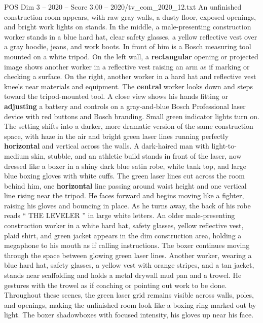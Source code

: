 \begin{textsample}{POS Dim 3 – 2020 – Score 3.00 – 2020/tv\_com\_2020\_12.txt}  \label{ex:f3_pos_080}
An unfinished construction room appears, with raw gray walls, a dusty floor, exposed openings, and bright work lights on stands.
In the middle, a male-presenting construction worker stands in a blue hard hat, clear safety glasses, a yellow reflective vest over a gray hoodie, jeans, and work boots.
In front of him is a Bosch measuring tool mounted on a white tripod.
On the left wall, a \textbf{rectangular} opening or projected image shows another worker in a reflective vest raising an arm as if marking or checking a surface.
On the right, another worker in a hard hat and reflective vest kneels near materials and equipment.
The \textbf{central} worker looks down and steps toward the tripod-mounted tool.
A close view shows his hands fitting or \textbf{adjusting} a battery and controls on a gray-and-blue Bosch Professional laser device with red buttons and Bosch branding.
Small green indicator lights turn on.
The setting shifts into a darker, more dramatic version of the same construction space, with haze in the air and bright green laser lines running perfectly \textbf{horizontal} and vertical across the walls.
A dark-haired man with light-to-medium skin, stubble, and an athletic build stands in front of the laser, now dressed like a boxer in a shiny dark blue satin robe, white tank top, and large blue boxing gloves with white cuffs.
The green laser lines cut across the room behind him, one \textbf{horizontal} line passing around waist height and one vertical line rising near the tripod.
He faces forward and begins moving like a fighter, raising his gloves and bouncing in place.
As he turns away, the back of his robe reads “ THE LEVELER ” in large white letters.
An older male-presenting construction worker in a white hard hat, safety glasses, yellow reflective vest, plaid shirt, and green jacket appears in the dim construction area, holding a megaphone to his mouth as if calling instructions.
The boxer continues moving through the space between glowing green laser lines.
Another worker, wearing a blue hard hat, safety glasses, a yellow vest with orange stripes, and a tan jacket, stands near scaffolding and holds a metal drywall mud pan and a trowel.
He gestures with the trowel as if coaching or pointing out work to be done.
Throughout these scenes, the green laser grid remains visible across walls, poles, and openings, making the unfinished room look like a boxing ring marked out by light.
The boxer shadowboxes with focused intensity, his gloves up near his face.

\end{textsample}
